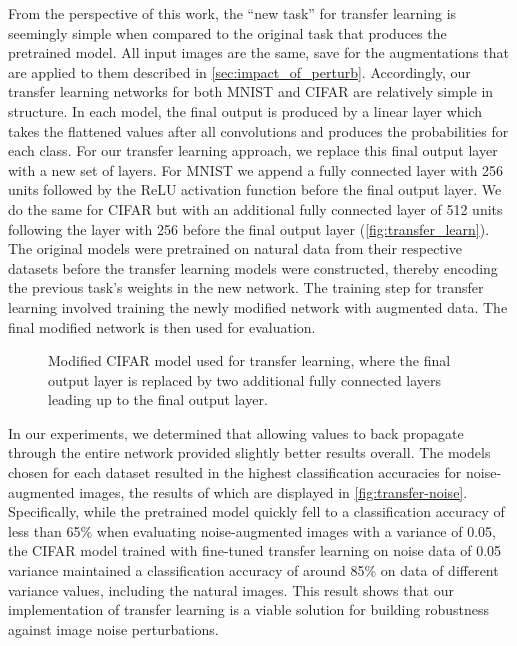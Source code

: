 \documentclass[conference]{IEEEtran}
\begin{document}
From the perspective of this work, the “new task” for transfer learning is seemingly simple when compared to the original task that produces the pretrained model. All input images are the same, save for the augmentations that are applied to them described in \autoref{sec:impact_of_perturb}. Accordingly, our transfer learning networks for both MNIST and CIFAR are relatively simple in structure. In each model, the final output is produced by a linear layer which takes the flattened values after all convolutions and produces the probabilities for each class. For our transfer learning approach, we replace this final output layer with a new set of layers. For MNIST we append a fully connected layer with 256 units followed by the ReLU activation function before the final output layer. We do the same for CIFAR but with an additional fully connected layer of 512 units following the layer with 256 before the final output layer (\autoref{fig:transfer_learn}). The original models were pretrained on natural data from their respective datasets before the transfer learning models were constructed, thereby encoding the previous task’s weights in the new network. The training step for transfer learning involved training the newly modified network with augmented data. The final modified network is then used for evaluation.

\begin{figure}[H]
	\centering
	
	\captionsetup{width=1\linewidth}
	\caption{Modified CIFAR model used for transfer learning, where the final output layer is replaced by two additional fully connected layers leading up to the final output layer.}
	\label{fig:transfer_learn}
\end{figure}

In our experiments, we determined that allowing values to back propagate through the entire network provided slightly better results overall. The models chosen for each dataset resulted in the highest classification accuracies for noise-augmented images, the results of which are displayed in \autoref{fig:transfer-noise}. Specifically, while the pretrained model quickly fell to a classification accuracy of less than 65\% when evaluating noise-augmented images with a variance of 0.05, the CIFAR model trained with fine-tuned transfer learning on noise data of 0.05 variance maintained a classification accuracy of around 85\% on data of different variance values, including the natural images. This result shows that our implementation of transfer learning is a viable solution for building robustness against image noise perturbations.
\end{document}
